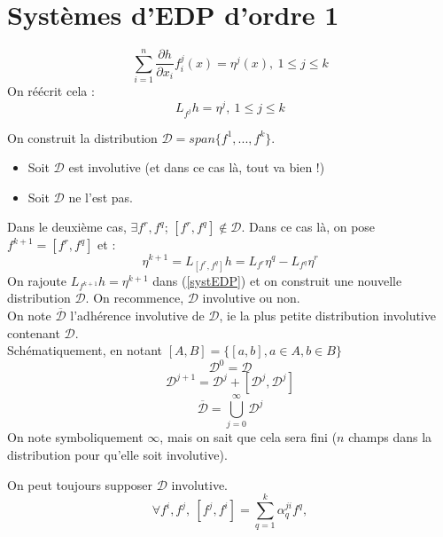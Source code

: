 \section{Systèmes d'EDP d'ordre 1}
\begin{equation} \label{systEDP} \tag{S} \sum_{i=1}^n \frac{\partial h}{\partial x_i}f_i^j(x)=\eta^j(x),\ 1\leq j\leq k \end{equation}
On réécrit cela : \[L_{f^j}h=\eta^j,\ 1\leq j\leq k\]

On construit la distribution $\mathcal{D}=span\{f^1,...,f^k\}$.
\begin{itemize}
	\item Soit $\mathcal{D}$ est involutive (et dans ce cas là, tout va bien !)
	\item Soit $\mathcal{D}$ ne l'est pas.
\end{itemize}

Dans le deuxième cas, $\exists f^r, f^q$; $[f^r,f^q]\not\in \mathcal{D}$. Dans ce cas là, on pose $f^{k+1}=[f^r,f^q]$ et : 
\[\eta^{k+1}=L_{[f^r,f^q]}h=L_{f^r}\eta^q-L_{f^q}\eta^r\]
On rajoute $L_{f^{k+1}}h=\eta^{k+1}$ dans (\ref{systEDP}) et on construit une nouvelle distribution $\mathcal{D}$. On recommence, $\mathcal{D}$ involutive ou non.\\

\bigskip
On note $\overline{\mathcal{D}}$ l'adhérence involutive de $\mathcal{D}$, ie la plus petite distribution involutive contenant $\mathcal{D}$.\\
Schématiquement, en notant $[A,B]=\{[a,b],a\in A, b\in B\}$
\[\mathcal{D}^0=\mathcal{D}\]
\[\mathcal{D}^{j+1}=\mathcal{D}^j+[\mathcal{D}^j, \mathcal{D}^j] \]
\[\overline{\mathcal{D}}=\bigcup_{j=0}^\infty \mathcal{D}^j\]
On note symboliquement $\infty$, mais on sait que cela sera fini ($n$ champs dans la distribution pour qu'elle soit involutive).

\bigskip
On peut toujours supposer $\mathcal{D}$ involutive. 
\[\forall f^i, f^j,\ [f^j, f^i]=\sum_{q=1}^k \alpha_q^{ji} f^q,\]

